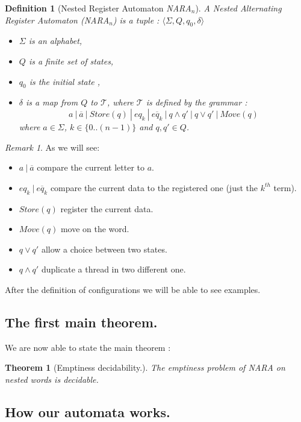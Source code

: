\documentclass[a4paper,10pt]{report}
\newtheorem{thr}{Theorem} %
\newtheorem{df}{Definition}
\theoremstyle{remark}
\newtheorem{rk}{Remark}
\newcommand{\seg}[1]{\{#1\}}
\newcommand{\ts}{\seg{0 .. (n-1)}}
\begin{document}
\begin{df}[Nested Register Automaton \textit{NARA}$_n$]
  A Nested Alternating Register Automaton (\textit{NARA}$_n$) is a tuple : 
  $\langle \Sigma ,Q ,q_0, \delta   \rangle$
  \begin{itemize}
   \item $\Sigma$ is an alphabet,
   \item $Q$ is a finite set of states,
   \item $q_0$ is the initial state ,
   \item $ \delta $ is a map from $Q $ to $\mathcal{T} $, where $\mathcal{T}$ is defined by the grammar : 
   $$ a \ | \  \overline{a} \ | \ Store(q) \ | \ eq_k \ | \  \overline{eq_k} \ | \  q \wedge q' \ | \ q \vee q' \ | \ Move(q)  $$
  where $a \in \Sigma$, $k \in  \ts$ and $q,q' \in Q$.
  \end{itemize}

\end{df}
\begin{rk}
  As we will see: 
  \begin{itemize}
   \item $ a \ | \  \overline{a}$ compare the current letter to $a$.
   \item $eq_k \ | \  \overline{eq_k}$ compare the current data to the registered one (just the $k^{th}$ term).
   \item $Store(q)$ register the current data.
   \item $Move(q)$ move on the word.
   \item $q \vee q' $ allow a choice between two states.
   \item $q \wedge q'$  duplicate a thread in two different one. 
  \end{itemize}
 
\end{rk}
After the definition of configurations we will be able to see examples.


\subsection{The first main theorem.}
  We are now able to state the main theorem : 
\begin{thr}[Emptiness decidability.]
  \label{main}
 The emptiness problem of \textit{NARA} on nested words is decidable.
\end{thr}


\subsection{How our automata works.}
\end{document}
